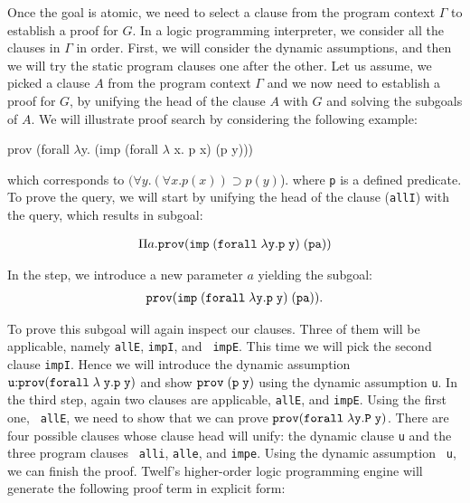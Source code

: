 \documentclass{llncs}
\newcommand{\figfoot}{\vspace{1ex}\hrule}
\newcommand{\pfLF}{{\tt{prov}}}
\newcommand{\impLF}{\tt{imp}\;}
\newcommand{\forallLF}{\tt{forall}\;}
\newcommand{\impl}{\supset}
\begin{document}

Once the goal is atomic, we need to select a clause from the
program context $\Gamma$ to establish a proof for $G$. In a logic
programming interpreter, we consider all the clauses in $\Gamma$ in order. 
First, we will consider the dynamic assumptions, and then we will try
the static program clauses one after the other. 
Let us assume, we picked a clause $A$ from the program context
$\Gamma$ and we now need to establish a proof for $G$, by unifying the
head of the clause $A$ with $G$ and solving the subgoals of $A$.
We will illustrate proof search by considering the following example:  

\begin{code}
prov (forall $\lambda$y. (imp (forall $\lambda$ x. p x) (p y)))  
\end{code}

which corresponds to $(\forall y. (\forall x.p(x)) \impl p(y)$).  
where {\tt p} is a defined predicate. To prove the query, we will
start by unifying the head of the clause ({\tt allI}) with the
query, which results in subgoal:  

\[
\begin{array}{c}
\Pi a. \pfLF ( \impLF (\forallLF \lambda y. p\; y)\; (p a))
\end{array}
\]

In the {} step, we introduce a new parameter $a$
yielding the subgoal:
\[
\begin{array}{c}
\pfLF ( \impLF (\forallLF \lambda y. p\; y)\; (p a)).
\end{array}
\]

To prove this subgoal will again inspect our clauses. Three of them
will be applicable, namely {\tt allE}, {\tt impI}, and {\tt
  impE}. This time we will pick the second clause {\tt impI}. Hence we
will introduce the dynamic assumption ${\tt{u}} {:} \pfLF (\forallLF
\lambda \;y. p\; y)$ and show $\pfLF\; {\tt (p\; y)}$ using the dynamic
assumption {\tt{u}}. In the third step, again two clauses are
applicable,  {\tt allE}, and {\tt impE}. Using the first one, {\tt
  allE}, we need to show that we can prove $\pfLF (\forallLF \lambda
y. P\; y)$. There are four possible clauses whose clause head will
unify: the dynamic clause {\tt u} and the three program clauses {\tt
  alli}, {\tt alle}, and {\tt impe}. Using the dynamic assumption {\tt
  u}, we can finish the proof. Twelf's
higher-order logic programming engine will generate the following
proof term in explicit form:  
\end{document}
